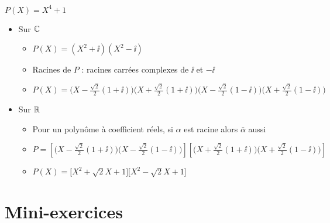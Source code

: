 \begin{frame}
\begin{exemple}
$P(X)=X^4+1$ 
\pause
\begin{itemize}
  \item Sur $\mathbb{C}$ 
  \pause
  \begin{itemize}
  \setlength{\itemsep}{6pt} 
    \item $P(X)=(X^2+\ii)(X^2-\ii)$
\pause
    \item Racines de $P$ : racines carrées complexes de $\ii$ et $-\ii$
\pause
    \item $P(X)=\big(X-\tfrac{\sqrt2}{2}(1+\ii)\big)\big(X+\tfrac{\sqrt2}{2}(1+\ii)\big)\big(X-\tfrac{\sqrt2}{2}(1-\ii)\big)
\big(X+\tfrac{\sqrt2}{2}(1-\ii)\big)$
  \end{itemize} 
  
\pause
\medskip

  \item Sur $\mathbb{R}$
\pause
  \begin{itemize}
  \setlength{\itemsep}{6pt} 
    \item Pour un polynôme à coefficient réels, si $\alpha$ est racine alors $\bar \alpha$ aussi
\pause
    \item {\scriptsize $P \!=\!\left[\big(X-\tfrac{\sqrt2}{2}(1+\ii)\big)\big(X-\tfrac{\sqrt2}{2}(1-\ii)\big)\right]
\left[\big(X+\tfrac{\sqrt2}{2}(1+\ii)\big)\big(X+\tfrac{\sqrt2}{2}(1-\ii)\big)\right]$}
\pause
    \item $P(X)= \big[X^2+\sqrt2X+1\big]\big[X^2-\sqrt2X+1\big]$
  \end{itemize}
\end{itemize} 
\end{exemple}

\end{frame}



\section{Mini-exercices}

